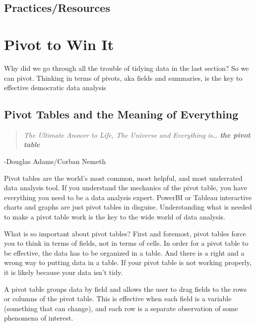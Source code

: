 \documentclass[]{book}
\begin{document}
\hypertarget{practicesresources}{%
\section{Practices/Resources}\label{practicesresources}}

\hypertarget{pivot-to-win-it}{%
\chapter{Pivot to Win It}\label{pivot-to-win-it}}

Why did we go through all the trouble of tidying data in the last section? So we can pivot. Thinking in terms of pivots, aka fields and summaries, is the key to effective democratic data analysis

\hypertarget{pivot-tables-and-the-meaning-of-everything}{%
\section{Pivot Tables and the Meaning of Everything}\label{pivot-tables-and-the-meaning-of-everything}}

\begin{quote}
\emph{The Ultimate Answer to Life, The Universe and Everything is\ldots{} \textbf{the pivot table}}
\end{quote}

-Douglas Adams/Corban Nemeth

Pivot tables are the world's most common, most helpful, and most underrated data analysis tool. If you understand the mechanics of the pivot table, you have everything you need to be a data analysis expert. PowerBI or Tableau interactive charts and graphs are just pivot tables in disguise. Understanding what is needed to make a pivot table work is the key to the wide world of data analysis.

What is so important about pivot tables? First and foremost, pivot tables force you to think in terms of fields, not in terms of cells. In order for a pivot table to be effective, the data has to be organized in a table. And there is a right and a wrong way to putting data in a table. If your pivot table is not working properly, it is likely because your data isn't tidy.

A pivot table groups data by field and allows the user to drag fields to the rows or columns of the pivot table. This is effective when each field is a variable (something that can change), and each row is a separate observation of some phenomena of interest.
\end{document}
